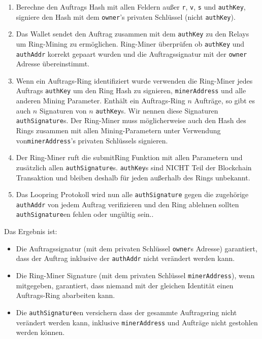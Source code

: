 \documentclass[UTF8,nofonts]{article}
\begin{document}
\begin{multicols}{2}
\begin{enumerate}
	\item Berechne den Auftrags Hash mit allen Feldern außer  \verb|r|, \verb|v|, \verb|s| und \verb|authKey|, signiere den Hash mit dem \verb|owner|'s privaten Schlüssel (nicht \verb|authKey|).

	\item Das Wallet sendet den Auftrag zusammen mit dem  \verb|authKey| zu den Relays um Ring-Mining zu ermöglichen. Ring-Miner überprüfen ob \verb|authKey| und \verb|authAddr| korrekt gepaart wurden und die Auftragssignatur mit der \verb|owner| Adresse übereinstimmt.

	\item Wenn ein Auftrags-Ring identifiziert wurde verwenden die Ring-Miner jedes Auftrags \verb|authKey| um den Ring Hash zu signieren, \verb|minerAddress| und alle anderen Mining Parameter. Enthält ein Auftrags-Ring $n$ Aufträge, so gibt es auch $n$ Signaturen von $n$ \verb|authKey|s. Wir nennen diese Signaturen \verb|authSignature|s. Der Ring-Miner muss möglicherweise auch den Hash des Rings zusammen mit allen Mining-Parametern unter Verwendung von\verb|minerAddress|'s privaten Schlüssels signieren.

	\item Der Ring-Miner ruft die submitRing Funktion mit allen Parametern und zusätzlich allen \verb|authSignature|s. \verb|authKey|s sind NICHT Teil der Blockchain Transaktion und bleiben deshalb für jeden außerhalb des Rings unbekannt.

	\item Das Loopring Protokoll wird nun alle \verb|authSignature| gegen die zugehörige \verb|authAddr| von jedem Auftrag verifizieren und den Ring ablehnen sollten \verb|authSignature|en fehlen oder ungültig sein..
 
\end{enumerate}

Das Ergebnis ist:

\begin{itemize}

	\item  Die Auftragssignatur (mit dem privaten Schlüssel \verb|owner|s Adresse) garantiert, dass der Auftrag inklusive der \verb|authAddr| nicht verändert werden kann.
	\item  Die Ring-Miner Signature (mit dem privaten Schlüssel \verb|minerAddress|), wenn mitgegeben, garantiert, dass niemand mit der gleichen Identität einen Auftrags-Ring abarbeiten kann.
	\item  Die \verb|authSignature|en versichern dass der gesammte Auftragsring nicht verändert werden kann, inklusive \verb|minerAddress| und Aufträge nicht gestohlen werden können.


\end{itemize}
\end{multicols}
\end{document}
